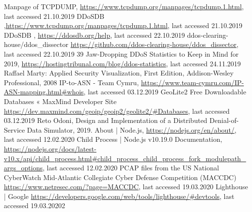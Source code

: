 \begin{thebibliography}{99}
 Manpage of TCPDUMP, \url{https://www.tcpdump.org/manpages/tcpdump.1.html}, last accessed 21.10.2019
 DDoSDB ,\url{https://www.tcpdump.org/manpages/tcpdump.1.html}, last accessed 21.10.2019
 DDoSDB , \url{https://ddosdb.org/help}, last accessed 22.10.2019
 ddos-clearing-house/ddos\_dissector \url{https://github.com/ddos-clearing-house/ddos_dissector}, last accessed 22.10.2019
 39 Jaw-Dropping DDoS Statistics to Keep in Mind for 2019, \url{https://hostingtribunal.com/blog/ddos-statistics}, last accessed 24.11.2019
 Raffael Marty: Applied Security Visualization, First Edition, Addison-Wesley Professional, 2008
 IP-to-ASN - Team Cymru, \url{https://www.team-cymru.com/IP-ASN-mapping.html#whois}, last accessed 03.12.2019
 GeoLite2 Free Downloadable Databases « MaxMind Developer Site \url{https://dev.maxmind.com/geoip/geoip2/geolite2/#Databases}, last accessed 03.12.2019
 Reto Odoni, Design and Implementation of a Distributed Denial-of-Service Data Simulator, 2019.
 About | Node.js, \url{https://nodejs.org/en/about/}, last accessed 12.02.2020
 Child Process | Node.js v10.19.0 Documentation, \url{https://nodejs.org/docs/latest-v10.x/api/child_process.html#child_process_child_process_fork_modulepath_args_options}, last accessed 12.02.2020
 PCAP files from the US National CyberWatch Mid-Atlantic Collegiate Cyber Defense Competition (MACCDC) \url{https://www.netresec.com/?page=MACCDC}, last accessed 19.03.2020
 Lighthouse | Google \url{https://developers.google.com/web/tools/lighthouse/#devtools}, last accessed 19.03.20202
\end{thebibliography}

